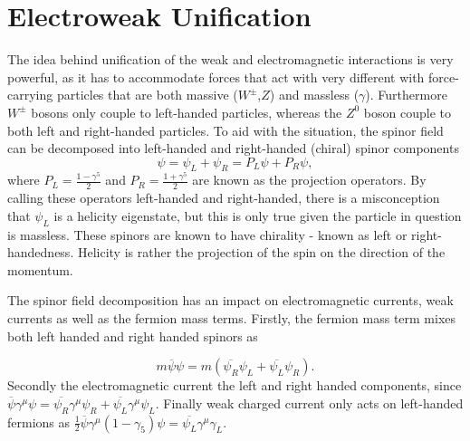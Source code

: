 \section{Electroweak Unification}
\label{weak}
The idea behind unification of the weak and electromagnetic interactions is very powerful, as it has to accommodate \DIFdelbegin {}\DIFdelend forces that act with very different \DIFdelbegin {}\DIFdelend \DIFaddbegin {}\DIFaddend with force-carrying particles that are both massive ($W^{\pm}$,$Z$) and massless ($\gamma$). Furthermore $W^{\pm}$ bosons only couple to left-handed particles, whereas the $Z^{0}$ boson couple to both left and right-handed particles. 
To aid with the situation, the spinor field can be decomposed into left-handed and right-handed (chiral) spinor components
\begin{equation}
	\psi=\psi_{L}+\psi_{R} = P_{L}\psi + P_{R}\psi,
\end{equation}
where $P_{L} =\frac{1-\gamma^{5}}{2}$ and $P_{R}=\frac{1+\gamma^{5}}{2}$ are known as the projection operators. By calling these operators left-handed and right-handed, there is a misconception that $\psi_{L}$ is a helicity eigenstate, but this is only true given the particle in question is massless. These spinors are known to have chirality - known as left or right-handedness. Helicity is rather the projection of the spin on the direction of the momentum.

The spinor field decomposition has an impact on electromagnetic currents, weak currents as well as the fermion mass terms. Firstly, the fermion mass term mixes both left handed and right handed spinors as 

\begin{equation}
	m\overline{\psi}\psi=m(\overline{\psi_{R}}\psi_{L} + \overline{\psi_{L}}\psi_{R}).
\label{eq:mixingpsi}
\end{equation}	
Secondly the electromagnetic current \DIFdelbegin {}\DIFdelend \DIFaddbegin {}\DIFaddend the left and right handed components, since $\overline{\psi}\gamma^{\mu}\psi=\overline{\psi_{R}}\gamma^{\mu}\psi_{R} + \overline{\psi_{L}}\gamma^{\mu}\psi_{L}$. Finally \DIFaddbegin {}\DIFaddend weak charged current only acts on left-handed fermions as $\frac{1}{2}\overline{\psi}\gamma^{\mu}(1-\gamma_{5})\psi = \overline{\psi_{L}}\gamma^{\mu}\gamma_{L}$.   


